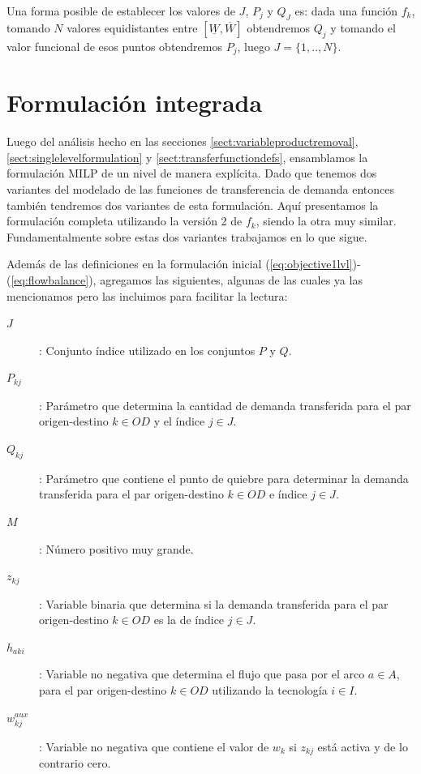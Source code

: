 Una forma posible de establecer los valores de $J$, $P_j$ y $Q_J$ es: dada una función $f_k$, tomando $N$ valores equidistantes entre $[\underline{W}, \overline{W}]$ obtendremos $Q_j$ y tomando el valor funcional de esos puntos obtendremos $P_j$, luego $J=\{1,..,N\}$.

\section{Formulación integrada}
\label{sect:alltogether}

Luego del análisis hecho en las secciones \ref{sect:variableproductremoval}, \ref{sect:singlelevelformulation} y \ref{sect:transferfunctiondefs}, ensamblamos la formulación MILP de un nivel de manera explícita. Dado que tenemos dos variantes del modelado de las funciones de transferencia de demanda entonces también tendremos dos variantes de esta formulación. Aquí presentamos la formulación completa utilizando la versión 2 de $f_k$, siendo la otra muy similar. Fundamentalmente sobre estas dos variantes trabajamos en lo que sigue.

Además de las definiciones en la formulación inicial (\ref{eq:objective1lvl})-(\ref{eq:flowbalance}), agregamos las siguientes, algunas de las cuales ya las mencionamos pero las incluimos para facilitar la lectura:

\begin{description}
  \item[$J$]: Conjunto índice utilizado en los conjuntos $P$ y $Q$.
  \item[$P_{kj}$]: Parámetro que determina la cantidad de demanda transferida para el par origen-destino $k \in OD$ y el índice $j \in J$.
  \item[$Q_{kj}$]: Parámetro que contiene el punto de quiebre para determinar la demanda transferida para el par origen-destino $k \in OD$ e índice $j \in J$.
  \item[$M$]: Número positivo muy grande.
  \item[$z_{kj}$]: Variable binaria que determina si la demanda transferida para el par origen-destino $k \in OD$ es la de índice $j \in J$.
  \item[$h_{aki}$]: Variable no negativa que determina el flujo que pasa por el arco $a \in A$, para el par origen-destino $k \in OD$ utilizando la tecnología $i \in I$.
  \item[$w^{aux}_{kj}$]: Variable no negativa que contiene el valor de $w_{k}$ si $z_{kj}$ está activa y de lo contrario cero.
\end{description}

